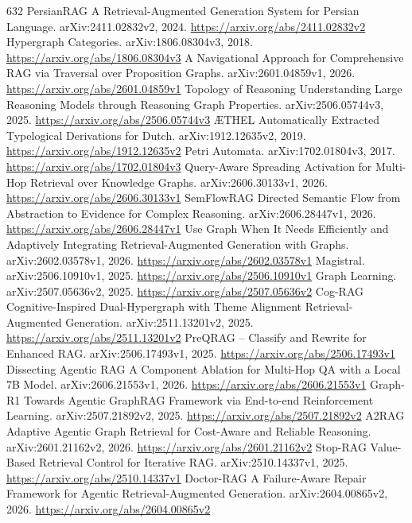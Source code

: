 \documentclass[11pt]{article}
\begin{document}
\begin{thebibliography}{632}
 PersianRAG A Retrieval-Augmented Generation System for Persian Language. arXiv:2411.02832v2, 2024. \url{https://arxiv.org/abs/2411.02832v2}
 Hypergraph Categories. arXiv:1806.08304v3, 2018. \url{https://arxiv.org/abs/1806.08304v3}
 A Navigational Approach for Comprehensive RAG via Traversal over Proposition Graphs. arXiv:2601.04859v1, 2026. \url{https://arxiv.org/abs/2601.04859v1}
 Topology of Reasoning Understanding Large Reasoning Models through Reasoning Graph Properties. arXiv:2506.05744v3, 2025. \url{https://arxiv.org/abs/2506.05744v3}
 ÆTHEL Automatically Extracted Typelogical Derivations for Dutch. arXiv:1912.12635v2, 2019. \url{https://arxiv.org/abs/1912.12635v2}
 Petri Automata. arXiv:1702.01804v3, 2017. \url{https://arxiv.org/abs/1702.01804v3}
 Query-Aware Spreading Activation for Multi-Hop Retrieval over Knowledge Graphs. arXiv:2606.30133v1, 2026. \url{https://arxiv.org/abs/2606.30133v1}
 SemFlowRAG Directed Semantic Flow from Abstraction to Evidence for Complex Reasoning. arXiv:2606.28447v1, 2026. \url{https://arxiv.org/abs/2606.28447v1}
 Use Graph When It Needs Efficiently and Adaptively Integrating Retrieval-Augmented Generation with Graphs. arXiv:2602.03578v1, 2026. \url{https://arxiv.org/abs/2602.03578v1}
 Magistral. arXiv:2506.10910v1, 2025. \url{https://arxiv.org/abs/2506.10910v1}
 Graph Learning. arXiv:2507.05636v2, 2025. \url{https://arxiv.org/abs/2507.05636v2}
 Cog-RAG Cognitive-Inspired Dual-Hypergraph with Theme Alignment Retrieval-Augmented Generation. arXiv:2511.13201v2, 2025. \url{https://arxiv.org/abs/2511.13201v2}
 PreQRAG -- Classify and Rewrite for Enhanced RAG. arXiv:2506.17493v1, 2025. \url{https://arxiv.org/abs/2506.17493v1}
 Dissecting Agentic RAG A Component Ablation for Multi-Hop QA with a Local 7B Model. arXiv:2606.21553v1, 2026. \url{https://arxiv.org/abs/2606.21553v1}
 Graph-R1 Towards Agentic GraphRAG Framework via End-to-end Reinforcement Learning. arXiv:2507.21892v2, 2025. \url{https://arxiv.org/abs/2507.21892v2}
 A2RAG Adaptive Agentic Graph Retrieval for Cost-Aware and Reliable Reasoning. arXiv:2601.21162v2, 2026. \url{https://arxiv.org/abs/2601.21162v2}
 Stop-RAG Value-Based Retrieval Control for Iterative RAG. arXiv:2510.14337v1, 2025. \url{https://arxiv.org/abs/2510.14337v1}
 Doctor-RAG A Failure-Aware Repair Framework for Agentic Retrieval-Augmented Generation. arXiv:2604.00865v2, 2026. \url{https://arxiv.org/abs/2604.00865v2}

\end{thebibliography}
\end{document}
